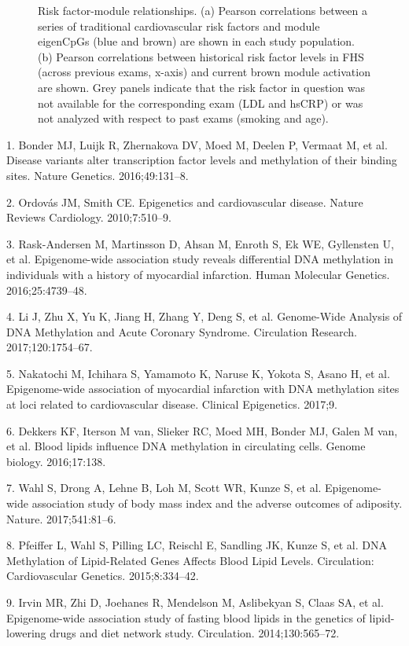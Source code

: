 \documentclass[]{bmcart}
\begin{document}
\begin{figure}[htbp]
\centering
\caption{\label{fig:risk-factor-correlation-plots}Risk factor-module
relationships. (a) Pearson correlations between a series of traditional
cardiovascular risk factors and module eigenCpGs (blue and brown) are
shown in each study population. (b) Pearson correlations between
historical risk factor levels in FHS (across previous exams, x-axis) and
current brown module activation are shown. Grey panels indicate that
the risk factor in question was not available for the corresponding exam
(LDL and hsCRP) or was not analyzed with respect to past exams (smoking
and age).}
\end{figure}

1. Bonder MJ, Luijk R, Zhernakova DV, Moed M, Deelen P, Vermaat M, et
al. Disease variants alter transcription factor levels and methylation
of their binding sites. Nature Genetics. 2016;49:131--8.

2. Ordov{á}s JM, Smith CE. Epigenetics and cardiovascular disease.
Nature Reviews Cardiology. 2010;7:510--9.

3. Rask-Andersen M, Martinsson D, Ahsan M, Enroth S, Ek WE, Gyllensten
U, et al. Epigenome-wide association study reveals differential DNA
methylation in individuals with a history of myocardial infarction.
Human Molecular Genetics. 2016;25:4739--48.

4. Li J, Zhu X, Yu K, Jiang H, Zhang Y, Deng S, et al. Genome-Wide
Analysis of DNA Methylation and Acute Coronary Syndrome. Circulation
Research. 2017;120:1754--67.

5. Nakatochi M, Ichihara S, Yamamoto K, Naruse K, Yokota S, Asano H, et
al. Epigenome-wide association of myocardial infarction with DNA
methylation sites at loci related to cardiovascular disease. Clinical
Epigenetics. 2017;9.

6. Dekkers KF, Iterson M van, Slieker RC, Moed MH, Bonder MJ, Galen M
van, et al. Blood lipids influence DNA methylation in circulating cells.
Genome biology. 2016;17:138.

7. Wahl S, Drong A, Lehne B, Loh M, Scott WR, Kunze S, et al.
Epigenome-wide association study of body mass index and the adverse
outcomes of adiposity. Nature. 2017;541:81--6.

8. Pfeiffer L, Wahl S, Pilling LC, Reischl E, Sandling JK, Kunze S, et
al. DNA Methylation of Lipid-Related Genes Affects Blood Lipid Levels.
Circulation: Cardiovascular Genetics. 2015;8:334--42.

9. Irvin MR, Zhi D, Joehanes R, Mendelson M, Aslibekyan S, Claas SA, et
al. Epigenome-wide association study of fasting blood lipids in the
genetics of lipid-lowering drugs and diet network study. Circulation.
2014;130:565--72.
\end{document}
